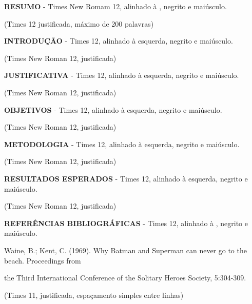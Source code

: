 \documentclass[a4paper,10pt]{article}
\begin{document}
  \noindent
  \textbf{RESUMO} - Times New Romam 12, alinhado à , negrito e maiúsculo.

  (Times 12 justificada, máximo de 200 palavras)

  \vspace{1ex}
  \noindent
  \textbf{INTRODUÇÃO} - Times 12, alinhado à esquerda, negrito e maiúsculo.

  (Times New Roman 12, justificada)

  \vspace{1ex}
  \noindent
  \textbf{JUSTIFICATIVA} - Times 12, alinhado à esquerda, negrito e maiúsculo.

  (Times New Roman 12, justificada)

  \noindent
  \textbf{OBJETIVOS} - Times 12, alinhado à esquerda, negrito e maiúsculo.

  (Times New Roman 12, justificada)

  \vspace{1ex}
  \noindent
  \textbf{METODOLOGIA} - Times 12, alinhado à esquerda, negrito e maiúsculo.

  (Times New Roman 12, justificada)

  \vspace{1ex}
  \noindent
  \textbf{RESULTADOS ESPERADOS} - Times 12, alinhado à esquerda, negrito e maiúsculo.

  (Times New Roman 12, justificada)

  \vspace{1ex}
  \noindent
  \textbf{REFERÊNCIAS BIBLIOGRÁFICAS} - Times 12, alinhado à , negrito e maiúsculo.

  \vspace{1ex}
  \noindent
  Waine, B.; Kent, C. (1969). Why Batman and Superman can never go to the beach. Proceedings from

  the Third International Conference of the Solitary Heroes Society, 5:304-309.

  (Times 11, justificada, espaçamento simples entre linhas)


\end{document}
